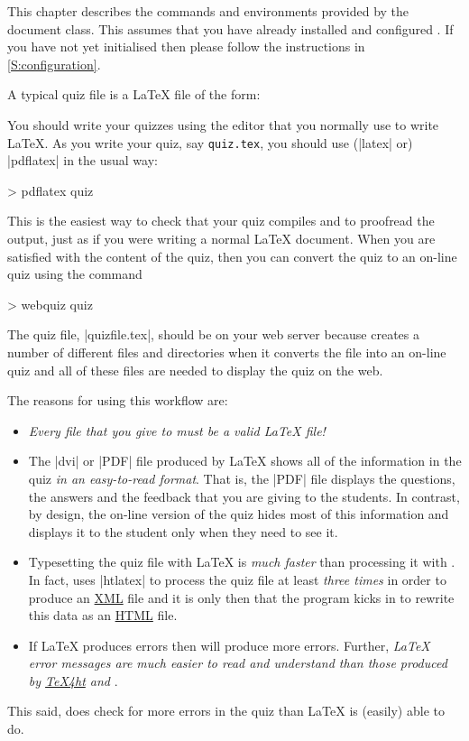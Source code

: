 \documentclass[svgnames]{article}
\newcommand\TeXfht{\href{https://www.ctan.org/tex4ht}{TeX4ht}\xspace}
\newcommand{\HTML}{\href{https://www.w3schools.com/html/html_intro.asp}{HTML}\xspace}
\newcommand\XML{\href{https://www.w3schools.com/xml/xml_whatis.asp}{XML}\xspace}
\begin{document}
    This chapter describes the commands and environments provided by the
    \WebQuiz document class. This assumes that you have already installed
    and configured \WebQuiz. If you have not yet initialised \WebQuiz
    then please follow the instructions in \autoref{S:configuration}.

    A typical \WebQuiz quiz file is a \LaTeX{} file of the form:


    \noindent You should write your quizzes using the editor that you
    normally use to write \LaTeX. As you write your quiz, say
    \texttt{quiz.tex}, you should use (\BashCode|latex| or)
    \BashCode|pdflatex| in the usual way:
    \begin{bashcode}
        > pdflatex quiz
    \end{bashcode}
    This is the easiest way to check that your quiz compiles and to
    proofread the output, just as if you were writing a normal \LaTeX{}
    document. When you are satisfied with the content of the quiz, then
    you can convert the quiz to an on-line quiz using the command
    \begin{bashcode}
       > webquiz quiz
    \end{bashcode}
    The quiz file, \BashCode|quizfile.tex|, should be on your web server
    because \WebQuiz creates a number of different files and directories
    when it converts the file into an on-line quiz and all of these files
    are needed to display the quiz on the web.

    The reasons for using this workflow are:
    \begin{itemize}
      \item \textit{Every file that you give to \WebQuiz must be a valid
      \LaTeX{} file!}

      \item The \BashCode|dvi| or \BashCode|PDF| file produced by \LaTeX{}
      shows all of the information in the quiz
      \textit{in an easy-to-read format}. That is, the \BashCode|PDF| file
      displays the questions, the answers and the feedback that you are
      giving to the students. In contrast, by design, the on-line version
      of the quiz hides most of this information and displays it to the
      student only when they need to see it.

      \item Typesetting the quiz file with \LaTeX{} is \textit{much
      faster} than processing it with \WebQuiz. In fact, \WebQuiz uses
      \BashCode|htlatex| to process the quiz file at least
      \textit{three times} in order to produce an \XML file and it is only
      then that the \WebQuiz program kicks in to rewrite this data as an
      \HTML file.

      \item If \LaTeX{} produces errors then \WebQuiz will produce more
      errors. Further, \textit{\LaTeX{} error messages are much easier to
      read and understand than those produced by \TeXfht and \WebQuiz}.
    \end{itemize}
    This said, \WebQuiz does check for more errors in the quiz than
    \LaTeX{} is (easily) able to do.
\end{document}
